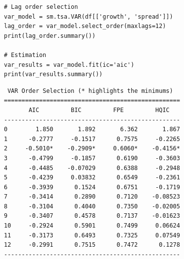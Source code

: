 \begin{frame}[fragile]
\begin{verbatim}
# Lag order selection
var_model = sm.tsa.VAR(df[['growth', 'spread']])
lag_order = var_model.select_order(maxlags=12)
print(lag_order.summary())

# Estimation
var_results = var_model.fit(ic='aic')
print(var_results.summary())
\end{verbatim}
\end{frame}

\begin{frame}[fragile]
\footnotesize
\begin{verbatim}
 VAR Order Selection (* highlights the minimums)  
==================================================
       AIC         BIC         FPE         HQIC   
--------------------------------------------------
0        1.850       1.892       6.362       1.867
1      -0.2777     -0.1517      0.7575     -0.2265
2     -0.5010*    -0.2909*     0.6060*    -0.4156*
3      -0.4799     -0.1857      0.6190     -0.3603
4      -0.4485    -0.07029      0.6388     -0.2948
5      -0.4239     0.03832      0.6549     -0.2361
6      -0.3939      0.1524      0.6751     -0.1719
7      -0.3414      0.2890      0.7120    -0.08523
8      -0.3104      0.4040      0.7350    -0.02005
9      -0.3407      0.4578      0.7137    -0.01623
10     -0.2924      0.5901      0.7499     0.06624
11     -0.3173      0.6493      0.7325     0.07549
12     -0.2991      0.7515      0.7472      0.1278
--------------------------------------------------
\end{verbatim}
\end{frame}

